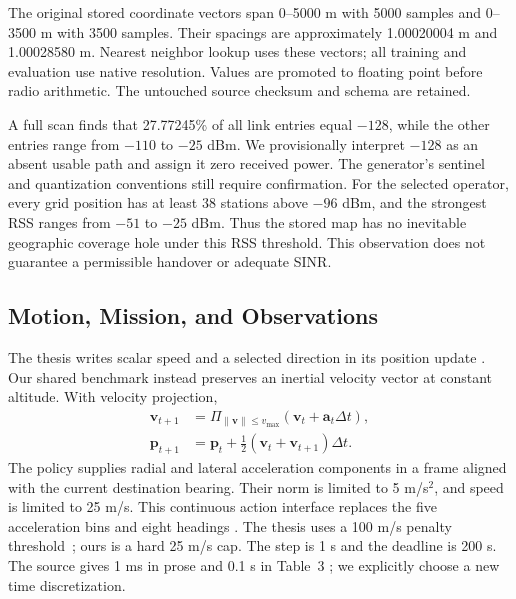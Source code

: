 \documentclass[conference]{IEEEtran}
\begin{document}
The original stored coordinate vectors span 0--5000 m with 5000 samples and
0--3500 m with 3500 samples. Their spacings are approximately 1.00020004 m and
1.00028580 m. Nearest neighbor lookup uses these vectors; all training and
evaluation use native resolution. Values are promoted to floating point before
radio arithmetic. The untouched source checksum and schema are retained.

A full scan finds that 27.77245\% of all link entries equal $-128$, while the
other entries range from $-110$ to $-25$ dBm. We provisionally interpret $-128$
as an absent usable path and assign it zero received power. The generator's
sentinel and quantization conventions still require confirmation. For the
selected operator, every grid position has at least 38 stations above
$-96$ dBm, and the strongest RSS ranges from $-51$ to $-25$ dBm. Thus the stored
map has no inevitable geographic coverage hole under this RSS threshold.
This observation does not guarantee a permissible handover or adequate SINR.

\subsection{Motion, Mission, and Observations}
The thesis writes scalar speed and a selected direction in its position update
\cite[p.~9, Sec.~3.2, Eq.~(2)]{thesis}. Our shared benchmark instead preserves
an inertial velocity vector at constant altitude. With velocity projection,
\begin{align}
\mathbf v_{t+1}&=\Pi_{\|\mathbf v\|\leq v_{\max}}
 (\mathbf v_t+\mathbf a_t\Delta t),\\
\mathbf p_{t+1}&=\mathbf p_t+
 \tfrac12(\mathbf v_t+\mathbf v_{t+1})\Delta t.
\end{align}
The policy supplies radial and lateral acceleration components in a frame
aligned with the current destination bearing. Their norm is limited to
5 m/s$^2$, and speed is limited to 25 m/s. This continuous action interface
replaces the five acceleration bins and eight headings
\cite[p.~12, Sec.~5.2; p.~15, Table~3]{thesis}. The thesis uses a 100 m/s
penalty threshold~\cite[p.~15, Table~3]{thesis}; ours is a hard 25 m/s cap.
The step is 1 s and the deadline is 200 s. The source gives 1 ms in prose
\cite[p.~14, Sec.~6.1]{thesis} and 0.1 s in Table~3
\cite[p.~15]{thesis}; we explicitly choose a new time discretization.
\end{document}
